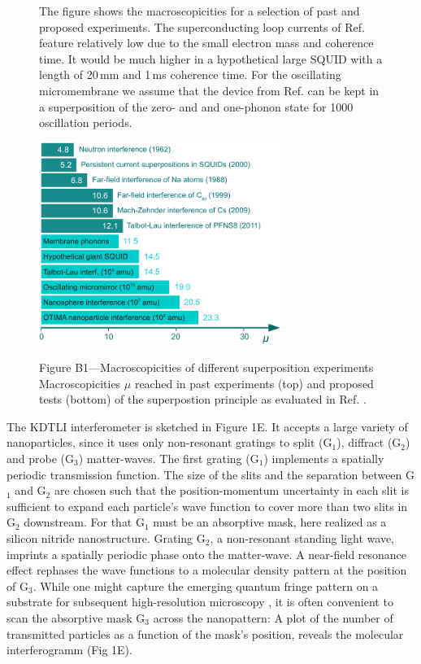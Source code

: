 \documentclass[12pt]{article}
\begin{document}
\begin{figure}
\begin{framed}
\hspace{1.5em}The figure shows the macroscopicities for a selection of past and proposed experiments. The superconducting loop currents of Ref.  feature relatively low
due to the small electron mass and coherence time. It would be much higher in a hypothetical large SQUID with a length of 20\,mm and 1\,ms coherence time. For the oscillating micromembrane we assume that the device from Ref.  can be kept in a superposition of the zero- and  and one-phonon state for 1000 oscillation periods.

\centerline{
\includegraphics[width=0.7\textwidth]{FigB.pdf}}
{\small\noindent
{Figure B1---Macroscopicities of different superposition experiments}
Macroscopicities $\mu$ reached in past experiments (top) and proposed tests (bottom) of the superpostion principle  as evaluated in Ref. .
}
\end{framed}
\end{figure}


The KDTLI interferometer is sketched in Figure 1E. It accepts a large variety of nanoparticles,
since it uses only non-resonant gratings to split (G$_1$), 
diffract (G$_2$) and probe (G$_3$) matter-waves.
The first grating (G$_1$) implements a spatially periodic transmission function. 
The size of the slits and the separation between G$_1$ and G$_2$ are chosen such that the position-momentum uncertainty in each
slit is sufficient to expand each particle's wave function to cover more than two slits
in G$_2$ downstream. For that G$_1$ must be an absorptive mask, here realized as a silicon nitride nanostructure.
Grating G$_2$, a non-resonant standing light wave, imprints a spatially periodic phase onto the matter-wave.
A near-field resonance effect rephases the wave functions to a molecular density pattern at the position of G$_3$.
While one might capture the emerging quantum fringe pattern on a substrate for subsequent high-resolution microscopy \cite{Juffmann2009, Juffmann2012a},
it is often convenient to scan the absorptive mask G$_3$ across the nanopattern: 
A plot of the number of transmitted particles as a function of the mask's position, reveals the molecular interferogramm (Fig 1E).
\end{document}
